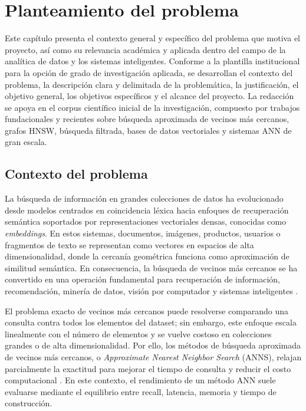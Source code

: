 \chapter{Planteamiento del problema}

Este capítulo presenta el contexto general y específico del problema que motiva el proyecto, así como su relevancia académica y aplicada dentro del campo de la analítica de datos y los sistemas inteligentes. Conforme a la plantilla institucional para la opción de grado de investigación aplicada, se desarrollan el contexto del problema, la descripción clara y delimitada de la problemática, la justificación, el objetivo general, los objetivos específicos y el alcance del proyecto. La redacción se apoya en el corpus científico inicial de la investigación, compuesto por trabajos fundacionales y recientes sobre búsqueda aproximada de vecinos más cercanos, grafos HNSW, búsqueda filtrada, bases de datos vectoriales y sistemas ANN de gran escala.

\section{Contexto del problema}

La búsqueda de información en grandes colecciones de datos ha evolucionado desde modelos centrados en coincidencia léxica hacia enfoques de recuperación semántica soportados por representaciones vectoriales densas, conocidas como \textit{embeddings}. En estos sistemas, documentos, imágenes, productos, usuarios o fragmentos de texto se representan como vectores en espacios de alta dimensionalidad, donde la cercanía geométrica funciona como aproximación de similitud semántica. En consecuencia, la búsqueda de vecinos más cercanos se ha convertido en una operación fundamental para recuperación de información, recomendación, minería de datos, visión por computador y sistemas inteligentes \parencite{wang2021comprehensive,subramanya2019diskann}.

El problema exacto de vecinos más cercanos puede resolverse comparando una consulta contra todos los elementos del dataset; sin embargo, este enfoque escala linealmente con el número de elementos y se vuelve costoso en colecciones grandes o de alta dimensionalidad. Por ello, los métodos de búsqueda aproximada de vecinos más cercanos, o \textit{Approximate Nearest Neighbor Search} (ANNS), relajan parcialmente la exactitud para mejorar el tiempo de consulta y reducir el costo computacional \parencite{malkov2020efficient,subramanya2019diskann}. En este contexto, el rendimiento de un método ANN suele evaluarse mediante el equilibrio entre recall, latencia, memoria y tiempo de construcción.

